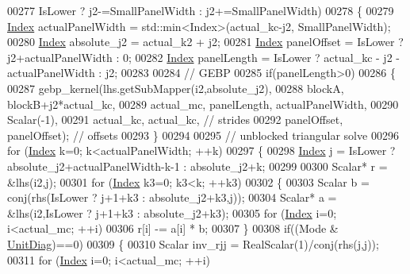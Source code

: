 \begin{DoxyCode}
00277                IsLower ? j2-=SmallPanelWidth : j2+=SmallPanelWidth)
00278           \{
00279             \hyperlink{namespace_eigen_a62e77e0933482dafde8fe197d9a2cfde}{Index} actualPanelWidth = std::min<Index>(actual\_kc-j2, SmallPanelWidth);
00280             \hyperlink{namespace_eigen_a62e77e0933482dafde8fe197d9a2cfde}{Index} absolute\_j2 = actual\_k2 + j2;
00281             \hyperlink{namespace_eigen_a62e77e0933482dafde8fe197d9a2cfde}{Index} panelOffset = IsLower ? j2+actualPanelWidth : 0;
00282             \hyperlink{namespace_eigen_a62e77e0933482dafde8fe197d9a2cfde}{Index} panelLength = IsLower ? actual\_kc - j2 - actualPanelWidth : j2;
00283 
00284             \textcolor{comment}{// GEBP}
00285             \textcolor{keywordflow}{if}(panelLength>0)
00286             \{
00287               gebp\_kernel(lhs.getSubMapper(i2,absolute\_j2),
00288                           blockA, blockB+j2*actual\_kc,
00289                           actual\_mc, panelLength, actualPanelWidth,
00290                           Scalar(-1),
00291                           actual\_kc, actual\_kc, \textcolor{comment}{// strides}
00292                           panelOffset, panelOffset); \textcolor{comment}{// offsets}
00293             \}
00294 
00295             \textcolor{comment}{// unblocked triangular solve}
00296             \textcolor{keywordflow}{for} (\hyperlink{namespace_eigen_a62e77e0933482dafde8fe197d9a2cfde}{Index} k=0; k<actualPanelWidth; ++k)
00297             \{
00298               \hyperlink{namespace_eigen_a62e77e0933482dafde8fe197d9a2cfde}{Index} j = IsLower ? absolute\_j2+actualPanelWidth-k-1 : absolute\_j2+k;
00299 
00300               Scalar* r = &lhs(i2,j);
00301               \textcolor{keywordflow}{for} (\hyperlink{namespace_eigen_a62e77e0933482dafde8fe197d9a2cfde}{Index} k3=0; k3<k; ++k3)
00302               \{
00303                 Scalar b = conj(rhs(IsLower ? j+1+k3 : absolute\_j2+k3,j));
00304                 Scalar* a = &lhs(i2,IsLower ? j+1+k3 : absolute\_j2+k3);
00305                 \textcolor{keywordflow}{for} (\hyperlink{namespace_eigen_a62e77e0933482dafde8fe197d9a2cfde}{Index} i=0; i<actual\_mc; ++i)
00306                   r[i] -= a[i] * b;
00307               \}
00308               \textcolor{keywordflow}{if}((Mode & \hyperlink{group__enums_gga39e3366ff5554d731e7dc8bb642f83cdaddb72f888ac85d5a1c52333e54f9374b}{UnitDiag})==0)
00309               \{
00310                 Scalar inv\_rjj = RealScalar(1)/conj(rhs(j,j));
00311                 \textcolor{keywordflow}{for} (\hyperlink{namespace_eigen_a62e77e0933482dafde8fe197d9a2cfde}{Index} i=0; i<actual\_mc; ++i)

\end{DoxyCode}

